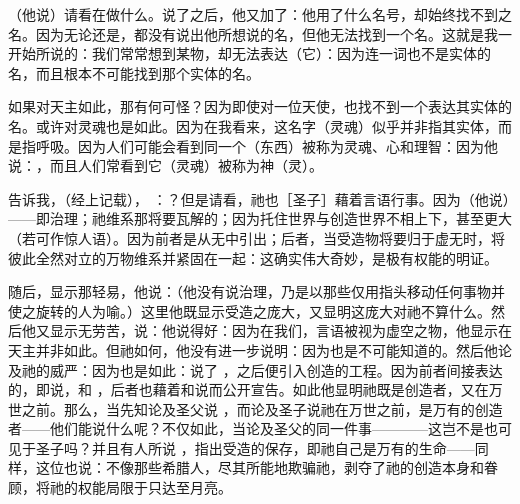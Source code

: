 （他说）请看在做什么。说了之后，他又加了：他用了什么名号，却始终找不到之名。因为无论还是，都没有说出他所想说的名，但他无法找到一个名。这就是我一开始所说的：我们常常想到某物，却无法表达（它）：因为连一词也不是实体的名，而且根本不可能找到那个实体的名。\par

如果对天主如此，那有何可怪？因为即使对一位天使，也找不到一个表达其实体的名。或许对灵魂也是如此。因为在我看来，这名字（灵魂）似乎并非指其实体，而是指呼吸。因为人们可能会看到同一个（东西）被称为灵魂、心和理智：因为他说：，而且人们常看到它（灵魂）被称为神（灵）。\par

 告诉我，（经上记载）， ：？但是请看，祂也［圣子］藉着言语行事。因为（他说）——即治理；祂维系那将要瓦解的；因为托住世界与创造世界不相上下，甚至更大（若可作惊人语）。因为前者是从无中引出；后者，当受造物将要归于虚无时，将彼此全然对立的万物维系并紧固在一起：这确实伟大奇妙，是极有权能的明证。\par

随后，显示那轻易，他说：（他没有说治理，乃是以那些仅用指头移动任何事物并使之旋转的人为喻。）这里他既显示受造之庞大，又显明这庞大对祂不算什么。然后他又显示无劳苦，说：他说得好：因为在我们，言语被视为虚空之物，他显示在天主并非如此。但祂如何，他没有进一步说明：因为也是不可能知道的。然后他论及祂的威严：因为也是如此：说了 ，之后便引入创造的工程。因为前者间接表达的，即说，和 ，后者也藉着和说而公开宣告。如此他显明祂既是创造者，又在万世之前。那么，当先知论及圣父说 ，而论及圣子说祂在万世之前，是万有的创造者——他们能说什么呢？不仅如此，当论及圣父的同一件事————这岂不是也可见于圣子吗？并且有人所说 ，指出受造的保存，即祂自己是万有的生命——同样，这位也说：不像那些希腊人，尽其所能地欺骗祂，剥夺了祂的创造本身和眷顾，将祂的权能局限于只达至月亮。\par

